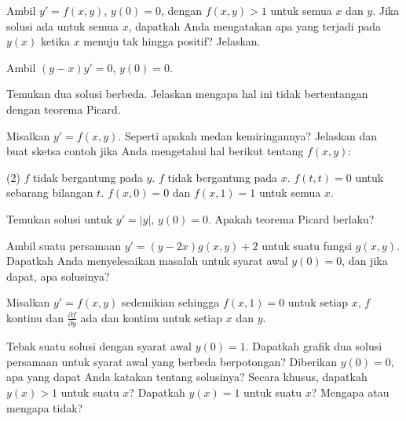 \begin{exercise}[menantang]
Ambil $y' = f(x,y)$, $y(0) = 0$, dengan $f(x,y) > 1$
untuk semua $x$ dan $y$.  Jika
solusi ada untuk semua $x$, dapatkah Anda mengatakan
apa yang terjadi pada $y(x)$ ketika $x$ menuju tak hingga positif?  Jelaskan.
\end{exercise}

\begin{exercise}[menantang]
Ambil $(y-x)y' = 0$, $y(0) = 0$.
\begin{tasks}
\task Temukan dua solusi berbeda.
\task Jelaskan mengapa hal ini tidak bertentangan dengan teorema Picard.
\end{tasks}
\end{exercise}

\begin{exercise}
Misalkan $y' = f(x,y)$.  Seperti apakah medan kemiringannya? Jelaskan dan
buat sketsa contoh jika Anda mengetahui hal berikut tentang $f(x,y)$:
\begin{tasks}(2)
\task $f$
tidak bergantung pada $y$.
\task $f$ tidak bergantung pada $x$.
\task $f(t,t) = 0$ untuk sebarang
bilangan $t$.
\task $f(x,0) = 0$ dan $f(x,1) = 1$ untuk semua $x$.
\end{tasks}
\end{exercise}

\begin{exercise}
Temukan solusi untuk $y' = \lvert y \rvert$, $y(0) = 0$.  Apakah teorema Picard berlaku?
\end{exercise}

\begin{exercise}
Ambil suatu persamaan $y' = (y-2x) g(x,y) + 2$ untuk suatu fungsi $g(x,y)$.
Dapatkah Anda menyelesaikan masalah untuk
syarat awal $y(0) = 0$,
dan jika dapat, apa solusinya?
\end{exercise}

\begin{exercise}[menantang]
\pagebreak[2]
Misalkan $y' = f(x,y)$ sedemikian sehingga $f(x,1) = 0$ untuk setiap $x$,
$f$ kontinu dan $\frac{\partial f}{\partial y}$ ada dan
kontinu untuk setiap $x$ dan $y$.
\begin{tasks}
\task
Tebak suatu solusi dengan syarat awal
$y(0) = 1$.
\task
Dapatkah grafik dua solusi persamaan untuk syarat awal yang berbeda
berpotongan?
\task
Diberikan $y(0) = 0$, apa yang dapat Anda katakan tentang solusinya?  Secara khusus,
dapatkah $y(x) > 1$ untuk suatu $x$?  Dapatkah $y(x) = 1$ untuk suatu $x$?  Mengapa atau mengapa tidak?
\end{tasks}
\end{exercise}

